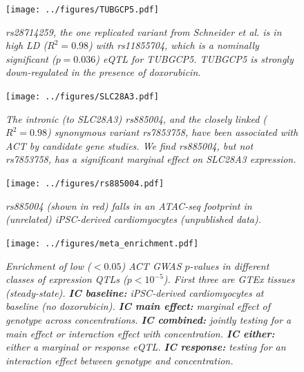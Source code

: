 \documentclass{article}
\begin{document}
\begin{figure}[h]
\begin{center}
    \texttt{[image: ../figures/TUBGCP5.pdf]} %
    \caption{\it{rs28714259, the one replicated variant from Schneider et al.\cite{Schneider2016} is in high LD ($R^2=0.98$) with rs11855704, which is a nominally significant ($p=0.036$) eQTL for \emph{TUBGCP5}. \emph{TUBGCP5} is strongly down-regulated in the presence of doxorubicin.}}
    \label{fig:TUBGCP5}
    \end{center}
\end{figure}

\begin{figure}[h]
\begin{center}
    \texttt{[image: ../figures/SLC28A3.pdf]} %
    \caption{\it{The intronic (to SLC28A3) rs885004, and the closely linked ($R^2=0.98$) synonymous variant rs7853758, have been associated with ACT by candidate gene studies\cite{Visscher2012-xl,Visscher2013-zs}. We find rs885004, but not rs7853758, has a significant marginal effect on SLC28A3 expression.}}
    \label{fig:SLC28A3}
    \end{center}
\end{figure}

\begin{figure}[h]
\begin{center}
    \texttt{[image: ../figures/rs885004.pdf]} %
    \caption{\it{rs885004 (shown in red) falls in an ATAC-seq footprint in (unrelated) iPSC-derived cardiomyocytes (unpublished data).}}
    \label{fig:rs885004}
    \end{center}
\end{figure}

\begin{figure}[h]
\begin{center}
    \texttt{[image: ../figures/meta\_enrichment.pdf]} 
    \caption{\it{Enrichment of low ($<0.05$) ACT GWAS $p$-values in different classes of expression QTLs ($p < 10^{-5}$). First three are GTEx tissues (steady-state). \textbf{IC baseline:} iPSC-derived cardiomyocytes at baseline (no doxorubicin). \textbf{IC main effect:} marginal effect of genotype across concentrations. \textbf{IC combined:} jointly testing for a main effect or interaction effect with concentration. \textbf{IC either:} either a marginal or response eQTL. \textbf{IC response:} testing for an interaction effect between genotype and concentration.}}
    \label{fig:meta_enrichment}
    \end{center}
\end{figure}
\end{document}
